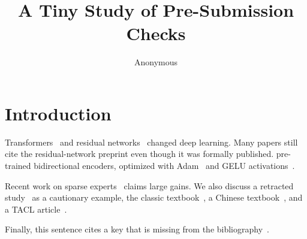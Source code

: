 \documentclass{article}
\title{A Tiny Study of Pre-Submission Checks}
\author{Anonymous}
\begin{document}
\maketitle

\section{Introduction}

Transformers~\citep{vaswani2017attention} and residual networks~\citep{he2016deep}
changed deep learning. Many papers still cite the residual-network preprint
\citep{he2015residual} even though it was formally published.
\citet{devlin2019bert} pre-trained bidirectional encoders, optimized with
Adam~\cite{kingma2015adam} and GELU activations~\citep[see][Sec.~2]{hendrycks2016gelu}.

Recent work on sparse experts~\citep{lindqvist2024quantum} claims large gains.
We also discuss a retracted study~\citep{wakefield1998ileal} as a cautionary example,
the classic textbook~\citep{goodfellow2016deep}, a Chinese textbook~\citep{zhou2016ml},
and a TACL article~\citep{tacl2019example}.

Finally, this sentence cites a key that is missing from the bibliography~\citep{nonexistent2023}.



\end{document}
